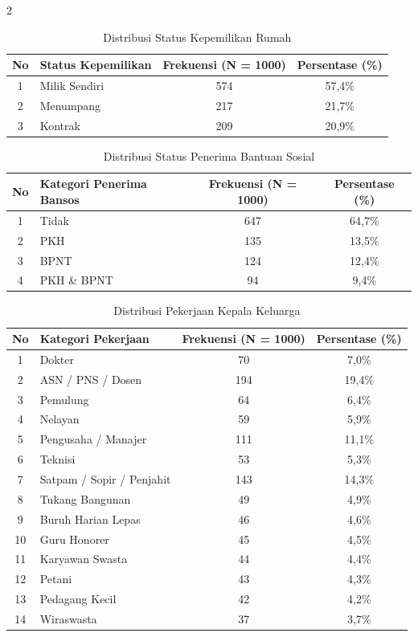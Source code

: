 \documentclass[12pt, a4paper, onecolumn, oneside]{report}
\begin{document}
\begin{spacing}{2}
\begin{table}[H]
\centering
\caption{Distribusi Status Kepemilikan Rumah}
\label{tab:dist_status_rumah}
\begin{tabular}{|c|l|c|c|}
\hline
\textbf{No} & \textbf{Status Kepemilikan} & \textbf{Frekuensi (N = 1000)} & \textbf{Persentase (\%)} \\ \hline
1 & Milik Sendiri & 574 & 57,4\% \\ \hline
2 & Menumpang & 217 & 21,7\% \\ \hline
3 & Kontrak & 209 & 20,9\% \\ \hline
\end{tabular}
\end{table}

\begin{table}[H]
\centering
\caption{Distribusi Status Penerima Bantuan Sosial}
\label{tab:dist_penerima_bantuan}
\begin{tabular}{|c|l|c|c|}
\hline
\textbf{No} & \textbf{Kategori Penerima Bansos} & \textbf{Frekuensi (N = 1000)} & \textbf{Persentase (\%)} \\ \hline
1 & Tidak & 647 & 64,7\% \\ \hline
2 & PKH & 135 & 13,5\% \\ \hline
3 & BPNT & 124 & 12,4\% \\ \hline
4 & PKH \& BPNT & 94 & 9,4\% \\ \hline
\end{tabular}
\end{table}

\begin{table}[H]
\centering
\caption{Distribusi Pekerjaan Kepala Keluarga}
\label{tab:dist_pekerjaan}
\begin{tabular}{|c|l|c|c|}
\hline
\textbf{No} & \textbf{Kategori Pekerjaan} & \textbf{Frekuensi (N = 1000)} & \textbf{Persentase (\%)} \\ \hline
1 & Dokter & 70 & 7,0\% \\ \hline
2 & ASN / PNS / Dosen & 194 & 19,4\% \\ \hline
3 & Pemulung & 64 & 6,4\% \\ \hline
4 & Nelayan & 59 & 5,9\% \\ \hline
5 & Pengusaha / Manajer & 111 & 11,1\% \\ \hline
6 & Teknisi & 53 & 5,3\% \\ \hline
7 & Satpam / Sopir / Penjahit & 143 & 14,3\% \\ \hline
8 & Tukang Bangunan & 49 & 4,9\% \\ \hline
9 & Buruh Harian Lepas & 46 & 4,6\% \\ \hline
10 & Guru Honorer & 45 & 4,5\% \\ \hline
11 & Karyawan Swasta & 44 & 4,4\% \\ \hline
12 & Petani & 43 & 4,3\% \\ \hline
13 & Pedagang Kecil & 42 & 4,2\% \\ \hline
14 & Wiraswasta & 37 & 3,7\% \\ \hline
\end{tabular}
\end{table}


\end{spacing}
\end{document}
